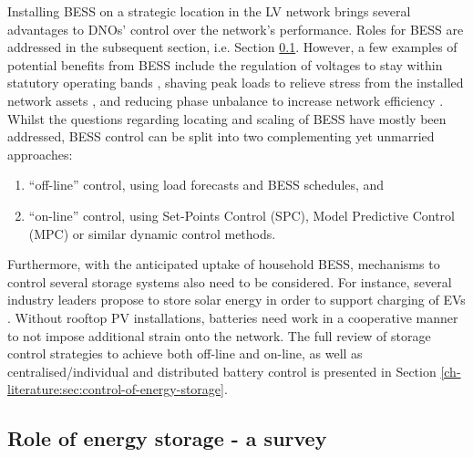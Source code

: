 Installing BESS on a strategic location in the LV network brings several advantages to DNOs' control over the network's performance.
Roles for BESS are addressed in the subsequent section, i.e. Section \ref{ch-introduction:subsec:role-of-energy-storage-a-survey}.
However, a few examples of potential benefits from BESS include the regulation of voltages to stay within statutory operating bands \cite{Yang2014}, shaving peak loads to relieve stress from the installed network assets \cite{Bennett2015}, and reducing phase unbalance to increase network efficiency \cite{Wang2015b} .
Whilst the questions regarding locating and scaling of BESS have mostly been addressed, BESS control can be split into two complementing yet unmarried approaches:

\begin{enumerate}
	\item ``off-line'' control, using load forecasts and BESS schedules, and
	\item ``on-line'' control, using Set-Points Control (SPC), Model Predictive Control (MPC) or similar dynamic control methods.
\end{enumerate}

Furthermore, with the anticipated uptake of household BESS, mechanisms to control several storage systems also need to be considered.
For instance, several industry leaders propose to store solar energy in order to support charging of EVs \cite{Baumann2017}.
Without rooftop PV installations, batteries need work in a cooperative manner to not impose additional strain onto the network.
The full review of storage control strategies to achieve both off-line and on-line, as well as centralised/individual and distributed battery control is presented in Section \ref{ch-literature:sec:control-of-energy-storage}.

\subsection{Role of energy storage - a survey}
\label{ch-introduction:subsec:role-of-energy-storage-a-survey}




